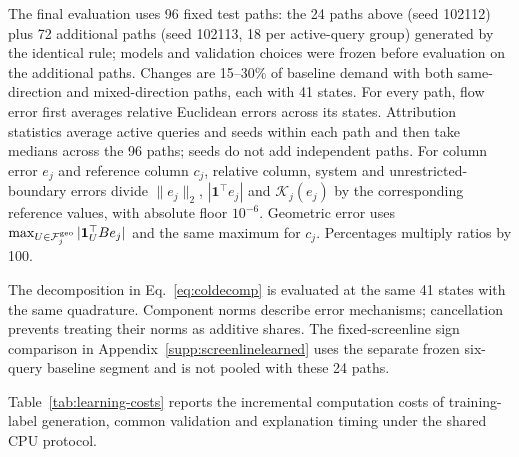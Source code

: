 The final evaluation uses 96 fixed test paths: the 24 paths above
(seed 102112) plus 72 additional paths (seed 102113, 18 per active-query
group) generated by the identical rule; models and validation choices
were frozen before evaluation on the additional paths. Changes
are 15--30\% of baseline demand with both same-direction and mixed-direction
paths, each with 41 states. For every path, flow error first averages relative
Euclidean errors across its states. Attribution statistics average active
queries and seeds within each path and then take medians across the 96 paths;
seeds do not add independent paths. For column error $e_j$ and reference column
$c_j$, relative column, system and unrestricted-boundary errors divide
$\|e_j\|_2$, $|\mathbf1^\top e_j|$ and $\mathcal K_j(e_j)$ by the
corresponding reference values, with absolute floor $10^{-6}$. Geometric error
uses $\max_{U\in\mathcal F_j^{\rm geo}}|\mathbf1_U^\top Be_j|$ and
the same maximum for $c_j$. Percentages multiply ratios by 100.

The decomposition in Eq.~\eqref{eq:coldecomp} is evaluated at the same 41 states
with the same quadrature. Component norms describe error mechanisms; cancellation
prevents treating their norms as additive shares. The fixed-screenline sign
comparison in Appendix~\ref{supp:screenlinelearned} uses the separate frozen
six-query baseline segment and is not pooled with these 24 paths.

Table~\ref{tab:learning-costs} reports the incremental computation
costs of training-label generation, common validation and explanation
timing under the shared CPU protocol.



